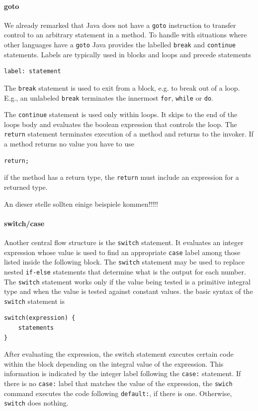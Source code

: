 \paragraph{goto}
We already remarked that Java does not have a \verb|goto| instruction
to transfer control to an arbitrary statement in a method. To handle
with situations where other languages have a \verb|goto| Java provides
the labelled \verb|break| and \verb|continue| statements. Labels are
typically used in blocks and loops and precede statements
\begin{verbatim}
label: statement
\end{verbatim}
The \verb|break| statement is used to exit from a block, e.g. to break
out of a loop. E.g., an unlabeled \verb|break| terminates the innermost
\verb|for|, \verb|while| or \verb|do|.

The \verb|continue| statement is used only within loops. It skips to
the end of the loops body and evaluates the boolean expression that
controls the loop. The \verb|return| statement terminates execution of
a method and returns to the invoker. If a method returns no value you
have to use
\begin{verbatim}
return;
\end{verbatim}
if the method has a return type, the \verb|return| must include an
expression for a returned type.



An dieser stelle sollten einige beispiele kommen!!!!!

\paragraph{switch/case}

Another central flow structure is the \verb|switch| statement. It
evaluates an integer expression whose value is used to find an
appropriate \verb|case| label among those listed inside the following
block. The \verb|switch| statement may be used to replace nested \verb|if-else|
statements that determine what is the output for each number. The
\verb|switch| statement works only if the value being tested is a
primitive integral type and when the value is tested against constant
values. the basic syntax of the \verb|switch| statement is
\begin{verbatim}
switch(expression) {
    statements
}
\end{verbatim}
After evaluating the expression, the switch statement executes
certain code within the block depending on the integral value of the
expression. This information is indicated by the integer label following
the \verb|case:| statement. If there is no \verb|case:| label that
matches the value of the expression, the \verb|swich| command executes
the code following \verb|default:|, if there is one. Otherwise,
\verb|switch| does nothing.

